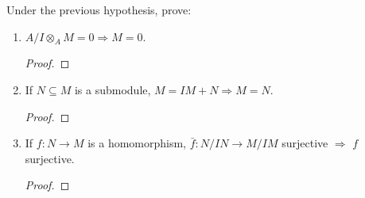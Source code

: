 \begin{problem}
    Under the previous hypothesis, prove:
    \begin{enumerate}[label=(\theproblem.\arabic*),ref=\theproblem.\arabic*]
        \item $A/I \otimes_A M = 0 \Rightarrow M = 0$.
            \begin{sol}
                \begin{proof}

                \end{proof}
            \end{sol}
        \item If $N \subseteq M$ is a submodule, $M = IM + N \Rightarrow M = N$.
            \begin{sol}
                \begin{proof}

                \end{proof}
            \end{sol}
        \item If $f: N \rightarrow M$ is a homomorphism, $\bar{f}: N/IN \rightarrow M/IM$ surjective $\Rightarrow$ $f$
        surjective.
            \begin{sol}
                \begin{proof}

                \end{proof}
            \end{sol}
    \end{enumerate}
\end{problem}